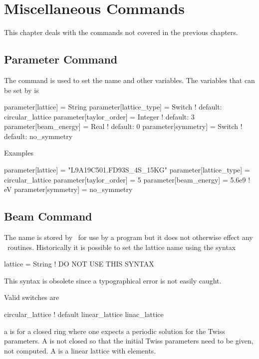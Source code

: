 \chapter{Miscellaneous Commands}

This chapter deals with the commands not covered in the previous chapters.

\section{Parameter Command}

The  command is used to set the  name and other variables. 
The variables that can be set by  is
\begin{example}
  parameter[lattice]      = String 
  parameter[lattice_type] = Switch      ! default: circular_lattice
  parameter[taylor_order] = Integer     ! default: 3
  parameter[beam_energy]  = Real        ! default: 0
  parameter[symmetry]     = Switch      ! default: no_symmetry 
\end{example}

\noindent
Examples
\begin{example}
  parameter[lattice]      = "L9A19C501.FD93S_4S_15KG"
  parameter[lattice_type] = circular_lattice
  parameter[taylor_order] = 5
  parameter[beam_energy]  = 5.6e9    ! eV
  parameter[symmetry]     = no_symmetry
\end{example}

\section{Beam Command}
\label{s:beam}

The  name is stored by \bmad\ for use by a program but it does
not otherwise effect any \bmad\ routines. 
Historically it is possible to set the lattice name using the syntax
\begin{example}
  lattice = String   ! DO NOT USE THIS SYNTAX
\end{example}
This syntax is obsolete since a typographical error is not easily caught.

\noindent
Valid  switches are
\begin{example}
  circular_lattice  ! default
  linear_lattice
  linac_lattice
\end{example}
a  is for a closed ring where one expects a periodic
solution for the Twiss parameters. A  is not closed
so that the initial Twiss parameters need to be given, not computed. A
 is a linear lattice with  elements.


